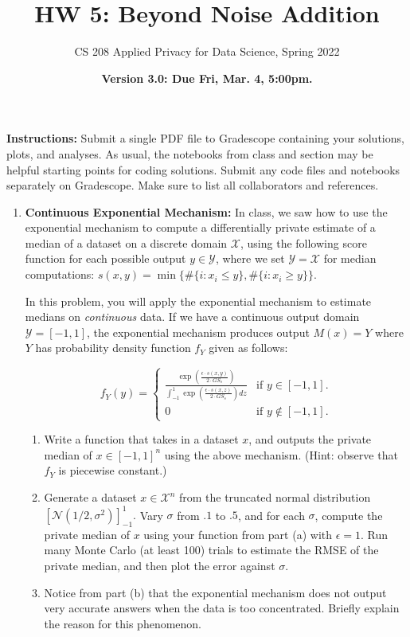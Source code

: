 \documentclass[11pt]{article}
\title{\vspace{-1.5cm} HW 5: Beyond Noise Addition
}
\author{CS 208 Applied Privacy for Data Science, Spring 2022}
\date{\textbf{Version 3.0: Due Fri, Mar. 4, 5:00pm.}}
\newcommand{\instructions}{\noindent \textbf{Instructions:} Submit a single PDF file to Gradescope containing your solutions, plots, and analyses. As usual, the notebooks from class and section may be helpful starting points for coding solutions. Submit any code files and notebooks separately on Gradescope. Make sure to list all collaborators and references.}
\newcommand{\calX}{\mathcal{X}}
\newcommand{\calY}{\mathcal{Y}}
\begin{document}
	\maketitle
	
	\instructions
	
	\begin{enumerate}[leftmargin=*]
		
		\item \textbf{Continuous Exponential Mechanism:}
		In class, we saw how to use the exponential mechanism to compute a differentially private estimate of a median of a dataset on a discrete domain $\calX$, using the following score function for each possible output $y\in \calY$, where we set $\calY=\calX$ for median computations:
		$s(x,y)=\min\{\#\{i: x_i\le y\},\#\{i: x_i\ge y\}\}.$

		
		In this problem, you will apply the exponential mechanism
		to estimate medians on {\em continuous} data.		
		If we have a continuous output domain $\calY=[-1,1]$, the exponential mechanism produces output
		$M(x) = Y$ where $Y$ has probability density function $f_Y$ given as follows:
		
		$$f_Y(y) = \begin{cases}
		\frac{\exp\left(\frac{\epsilon\cdot s(x,y)}{2\cdot GS_s}\right)}{\int_{-1}^1 \exp\left(\frac{\epsilon\cdot s(x,z)}{2\cdot GS_s}\right) dz} & \text{if } y\in [-1,1].\\
		0 & \text{if } y\notin [-1,1].
		\end{cases}$$
		
		\begin{enumerate}
			\item Write a function that takes in a dataset $x$, and outputs the private median of $x\in [-1,1]^n$ using the above mechanism.
			(Hint: observe that $f_Y$ is
			piecewise constant.)
			
			\item Generate a dataset $x\in\calX^n$ from the truncated normal distribution $\left[\mathcal{N}(1/2,\sigma^2)\right]_{-1}^1.$ Vary $\sigma$ from $.1$ to $.5$, and for each $\sigma$, compute the private median of $x$ using your function from part (a) with $\epsilon=1$. Run many Monte Carlo (at least 100)
			trials to estimate the RMSE
			of the private median, and then plot the error against $\sigma$.
			
			\item Notice from part (b) that the exponential mechanism does
			not output very accurate answers when the data is too concentrated. Briefly explain the reason for this phenomenon.
		\end{enumerate}
		

\end{enumerate}
\end{document}
